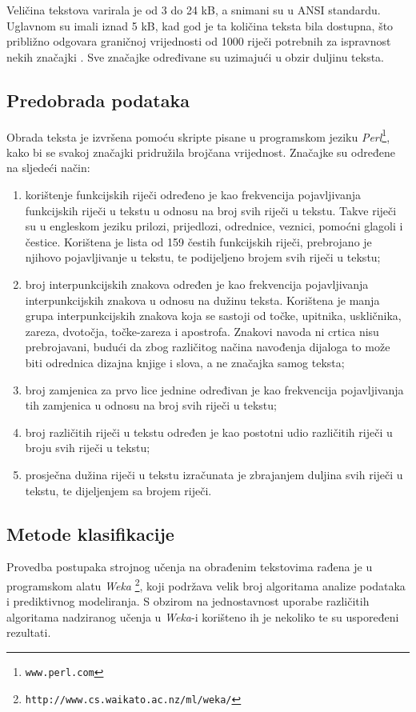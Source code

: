 \documentclass[10pt, a4paper]{article}
\begin{document}
Veličina tekstova varirala je od 3 do 24 kB, a snimani su u ANSI standardu. Uglavnom su imali iznad 5 kB, kad god je ta količina teksta bila dostupna, što približno odgovara graničnoj vrijednosti od 1000 riječi potrebnih za ispravnost nekih značajki  \citep{tweedie}. Sve značajke određivane su uzimajući u obzir duljinu teksta. 

\subsection{Predobrada podataka}
Obrada teksta je izvršena pomoću skripte pisane u programskom jeziku \emph{Perl}\footnote{\texttt{www.perl.com}}, kako bi se svakoj značajki pridružila brojčana vrijednost. Značajke su određene na sljedeći način:
\begin{enumerate}
\item korištenje funkcijskih riječi određeno je kao frekvencija pojavljivanja funkcijskih riječi u tekstu u odnosu na broj svih riječi u tekstu. Takve riječi su u engleskom jeziku prilozi, prijedlozi, odrednice, veznici, pomoćni glagoli i čestice. Korištena je lista od 159 čestih funkcijskih riječi, prebrojano je njihovo pojavljivanje u tekstu, te podijeljeno brojem svih riječi u tekstu;
\item broj interpunkcijskih znakova određen je kao frekvencija pojavljivanja interpunkcijskih znakova u odnosu na dužinu teksta. Korištena je manja grupa interpunkcijskih znakova koja se sastoji od točke, upitnika, uskličnika, zareza, dvotočja, točke-zareza i apostrofa. Znakovi navoda ni crtica nisu prebrojavani, budući da zbog različitog načina navođenja dijaloga to može biti odrednica dizajna knjige i slova, a ne značajka samog teksta;
\item broj zamjenica za prvo lice jednine određivan je kao frekvencija pojavljivanja tih zamjenica u odnosu na broj svih riječi u tekstu;
\item broj različitih riječi u tekstu određen je kao postotni udio različitih riječi u broju svih riječi u tekstu;
\item prosječna dužina riječi u tekstu izračunata je zbrajanjem duljina svih riječi u tekstu, te dijeljenjem sa brojem riječi.
\end{enumerate}


\subsection{Metode klasifikacije}

Provedba postupaka strojnog učenja na obrađenim tekstovima rađena je u programskom alatu \emph{Weka} \footnote{\texttt{http://www.cs.waikato.ac.nz/ml/weka/}}, koji podržava velik broj algoritama analize podataka i prediktivnog modeliranja. S obzirom na jednostavnost uporabe različitih algoritama nadziranog učenja u \emph{Weka}-i korišteno ih je nekoliko te su uspoređeni rezultati.  
\end{document}
